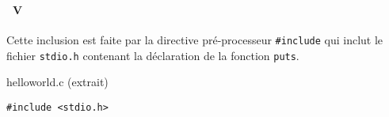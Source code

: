 \begin{frame}[containsverbatim]
  \frametitle{\secname}
  \framesubtitle{\subsecname~V}

  \par
  Cette inclusion est faite par la directive pré-processeur \verb|#include| qui inclut le fichier \verb|stdio.h| contenant la déclaration de la fonction \verb|puts|.
  \vspace{0.5cm}
  \begin{exampleblock}{helloworld.c (extrait)}
    \begin{verbatim}
#include <stdio.h>
    \end{verbatim}
  \end{exampleblock}
\end{frame}  

